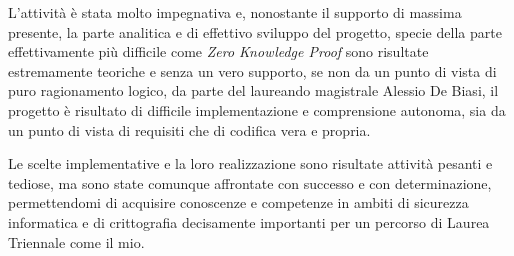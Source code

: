 L'attività è stata molto impegnativa e, nonostante il supporto di massima presente, la parte analitica e di effettivo sviluppo del progetto, specie della parte effettivamente più difficile come 
\textit{Zero Knowledge Proof} sono risultate estremamente teoriche e senza un vero supporto, se non da un punto di vista di puro ragionamento logico, da parte del laureando magistrale Alessio De Biasi, 
il progetto è risultato di difficile implementazione e comprensione autonoma, sia da un punto di vista di requisiti che di codifica vera e propria.

\clearpage

Le scelte implementative e la loro realizzazione sono risultate attività pesanti e tediose, 
ma sono state comunque affrontate con successo e con determinazione, permettendomi di acquisire conoscenze e competenze in ambiti di sicurezza informatica e di crittografia decisamente importanti per un percorso di Laurea Triennale come il mio.
\\

